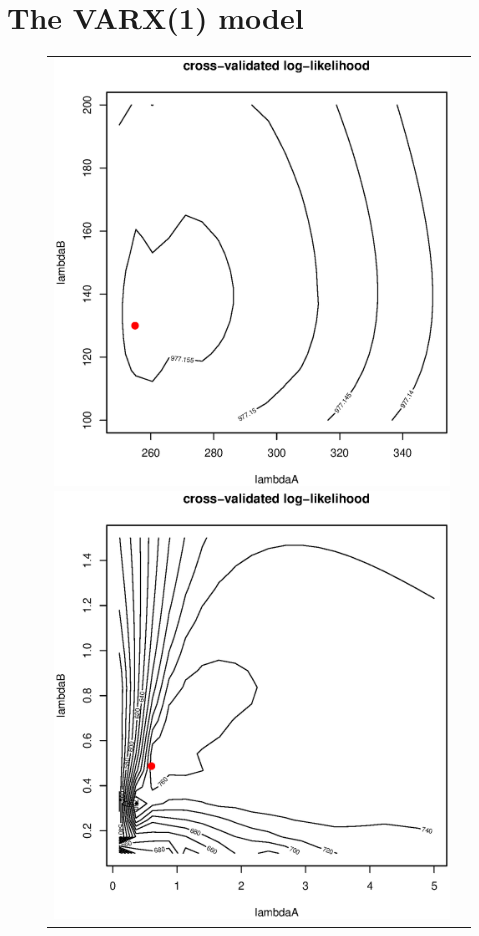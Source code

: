 \[
\]
\newpage
\mbox{ }
\newpage
\section{The VARX(1) model} 
\begin{figure}[h!]
\centering
\begin{tabular}{cc}
\includegraphics[scale=0.4]{Figure_15a.eps}
\includegraphics[scale=0.4]{Figure_15b.eps}

\end{tabular}
\end{figure}
